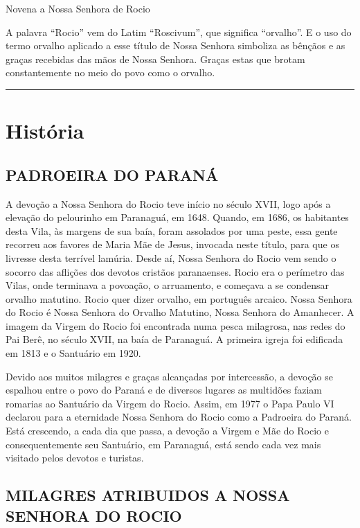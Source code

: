 \documentclass[a4paper,14pt,twoside]{extarticle} \usepackage[utf8]{inputenc}
\begin{document}
\begin{center}
  {\huge Novena a Nossa Senhora de Rocio}
\end{center}


A palavra “Rocio” vem do Latim “Roscivum”, que significa “orvalho”. E o uso do termo orvalho aplicado a esse título de Nossa Senhora simboliza as bênçãos e as graças recebidas das mãos de Nossa Senhora. Graças estas que brotam constantemente no meio do povo como o orvalho.


{\centering \rule{1.0\textwidth}{0.4pt}}

\tableofcontents
\thispagestyle{empty}


\newpage
\section{História}

\subsection{PADROEIRA DO PARANÁ}

A devoção a Nossa Senhora do Rocio teve início no século XVII, logo após a elevação do pelourinho em Paranaguá, em 1648. Quando, em 1686, os habitantes desta Vila, às margens de sua baía, foram assolados por uma peste, essa gente recorreu aos favores de Maria Mãe de Jesus, invocada neste título, para que os livresse desta terrível lamúria. Desde aí, Nossa Senhora do Rocio vem sendo o socorro das aflições dos devotos cristãos paranaenses. Rocio era o perímetro das Vilas, onde terminava a povoação, o arruamento, e começava a se condensar orvalho matutino. Rocio quer dizer orvalho, em português arcaico. Nossa Senhora do Rocio é Nossa Senhora do Orvalho Matutino, Nossa Senhora do Amanhecer. A imagem da Virgem do Rocio foi encontrada numa pesca milagrosa, nas redes do Pai Berê, no século XVII, na baía de Paranaguá. A primeira igreja foi edificada em 1813 e o Santuário em 1920.

Devido aos muitos milagres e graças alcançadas por intercessão, a devoção se espalhou entre o povo do Paraná e de diversos lugares as multidões faziam romarias ao Santuário da Virgem do Rocio. Assim, em 1977 o Papa Paulo VI declarou para a eternidade Nossa Senhora do Rocio como a Padroeira do Paraná. Está crescendo, a cada dia que passa, a devoção a Virgem e Mãe do Rocio e consequentemente seu Santuário, em Paranaguá, está sendo cada vez mais visitado pelos devotos e turistas.

 
\subsection{MILAGRES ATRIBUIDOS A NOSSA SENHORA DO ROCIO}
\end{document}
